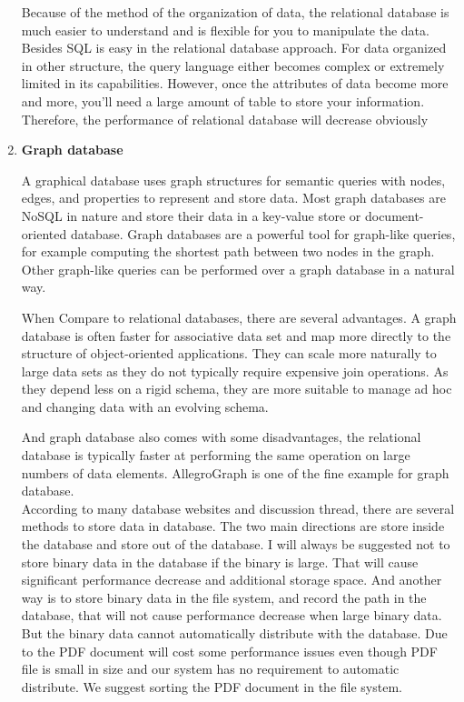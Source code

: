 \begin{enumerate}
	Because of the method of the organization of data, the relational database is much easier to understand and is flexible for you to manipulate the data. Besides SQL is easy in the relational database approach. For data organized in other structure, the query language either becomes complex or extremely limited in its capabilities. However, once the attributes of data become more and more, you'll need a large amount of table to store your information. Therefore, the performance of relational database will decrease obviously
	
	\item\textbf{Graph database}
	\setlength{\parindent}{1em}
	
	A graphical database uses graph structures for semantic queries with nodes, edges, and properties to represent and store data. Most graph databases are NoSQL in nature and store their data in a key-value store or document-oriented database. Graph databases are a powerful tool for graph-like queries, for example computing the shortest path between two nodes in the graph. Other graph-like queries can be performed over a graph database in a natural way.
	
	When Compare to relational databases, there are several advantages. A graph database is often faster for associative data set and map more directly to the structure of object-oriented applications. They can scale more naturally to large data sets as they do not typically require expensive join operations. As they depend less on a rigid schema, they are more suitable to manage ad hoc and changing data with an evolving schema.
	
	And graph database also comes with some disadvantages, the relational database is typically faster at performing the same operation on large numbers of data elements. AllegroGraph is one of the fine example for graph database. \\
	
	According to many database websites and discussion thread, there are several methods to store data in database. The two main directions are store inside the database and store out of the database. I will always be suggested not to store binary data in the database if the binary is large. That will cause significant performance decrease and additional storage space. And another way is to store binary data in the file system, and record the path in the database, that will not cause performance decrease when large binary data. But the binary data cannot automatically distribute with the database. Due to the PDF document will cost some performance issues even though PDF file is small in size and our system has no requirement to automatic distribute. We suggest sorting the PDF document in the file system.
	
\end{enumerate}


